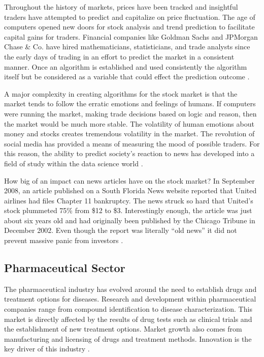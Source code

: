 \documentclass[sigconf]{acmart}
\begin{document}
Throughout the history of markets, prices have been tracked and insightful traders have attempted to predict and capitalize on price fluctuation. The age of computers opened new doors for stock analysis and trend prediction to facilitate capital gains for traders. Financial companies like Goldman Sachs and JPMorgan Chase \& Co. have hired mathematicians, statisticians, and trade analysts since the early days of trading in an effort to predict the market in a consistent manner. Once an algorithm is established and used consistently the algorithm itself but be considered as a variable that could effect the prediction outcome \cite{Hellstrom}. 

A major complexity in creating algorithms for the stock market is that the market tends to follow the erratic emotions and feelings of humans. If computers were running the market, making trade decisions based on logic and reason, then the market would be much more stable. The volatility of human emotions about money and stocks creates tremendous volatility in the market. The revolution of social media has provided a means of measuring the mood of possible traders. For this reason, the ability to predict society's reaction to news has developed into a field of study within the data science world \cite{BOLLEN}. 

How big of an impact can news articles have on the stock market? In September 2008, an article published on a South Florida News website reported that United airlines had files Chapter 11 bankruptcy. The news struck so hard that United's stock plummeted 75\% from \$12 to \$3. Interestingly enough, the article was just about six years old and had originally been published by the Chicago Tribune in December 2002. Even though the report was literally ``old news'' it did not prevent massive panic from investors \cite{www-chTrib}.

\subsection{Pharmaceutical Sector}
The pharmaceutical industry has evolved around the need to establish drugs and treatment options for diseases. Research and development within pharmaceutical companies range from compound identification to disease characterization. This market is directly affected by the results of drug tests such as clinical trials and the establishment of new treatment options. Market growth also comes from manufacturing and licensing of drugs and treatment methods. Innovation is the key driver of this industry \cite{Gassmann}.
\end{document}
